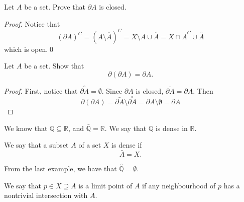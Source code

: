 \documentclass[notoc,notitlepage]{tufte-book}
\newcommand{\Int}[1]{\overset{\circ}{#1}}
\begin{document}
\begin{ex}
  Let $A$ be a set. Prove that $\partial A$ is closed.
\end{ex}

\begin{proof}
  Notice that
  \begin{equation*}
    ( \partial A )^C = ( \bar{A} \setminus \Int{A} )^C = X \setminus \bar{A} \cup \Int{A} = X \cap \bar{A}^C \cup \Int{A}
  \end{equation*}
  which is open.\qed\
\end{proof}

\begin{ex}
  Let $A$ be a set. Show that
  \begin{equation*}
    \partial ( \partial A ) = \partial A.
  \end{equation*}
\end{ex}

\begin{proof}
  First, notice that $\Int{\partial A} = \emptyset$.
  Since $\partial A$ is closed, $\bar{\partial A} = \partial A$.
  Then
  \begin{equation*}
    \partial ( \partial A ) = \bar{\partial A} \setminus \Int{\partial A}
      = \partial A \setminus \emptyset = \partial A
  \end{equation*}
\end{proof}

\begin{eg}
  We know that $\mathbb{Q} \subseteq \mathbb{R}$,
  and $\bar{\mathbb{Q}} = \mathbb{R}$.
  We say that $\mathbb{Q}$ is dense in $\mathbb{R}$.
\end{eg}

\begin{defn}[Dense]\label{defn:dense}
  We say that a subset $A$ of a set $X$ is dense if
  \begin{equation*}
    \bar{A} = X.
  \end{equation*}
\end{defn}

\begin{eg}
  From the last example, we have that $\Int{\mathbb{Q}} = \emptyset$.
\end{eg}

\begin{defn}[Limit Point]\label{defn:limit_point}
  We say that $p \in X \supseteq A$ is a limit point of $A$
  if any neighbourhood of $p$ has a nontrivial intersection
  with $A$.
\end{defn}
\end{document}
